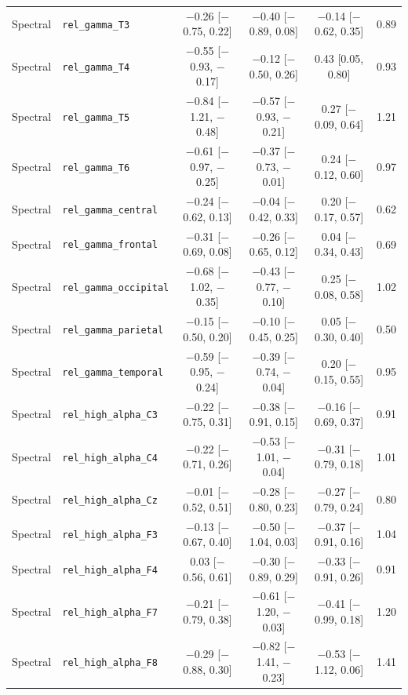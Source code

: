 {\begin{longtable}{llcccc}
Spectral & \texttt{rel\_gamma\_T3} & $-$0.26 [$-$0.75, 0.22] & $-$0.40 [$-$0.89, 0.08] & $-$0.14 [$-$0.62, 0.35] & 0.89 \\
Spectral & \texttt{rel\_gamma\_T4} & $-$0.55 [$-$0.93, $-$0.17] & $-$0.12 [$-$0.50, 0.26] & 0.43 [0.05, 0.80] & 0.93 \\
Spectral & \texttt{rel\_gamma\_T5} & $-$0.84 [$-$1.21, $-$0.48] & $-$0.57 [$-$0.93, $-$0.21] & 0.27 [$-$0.09, 0.64] & 1.21 \\
Spectral & \texttt{rel\_gamma\_T6} & $-$0.61 [$-$0.97, $-$0.25] & $-$0.37 [$-$0.73, $-$0.01] & 0.24 [$-$0.12, 0.60] & 0.97 \\
Spectral & \texttt{rel\_gamma\_central} & $-$0.24 [$-$0.62, 0.13] & $-$0.04 [$-$0.42, 0.33] & 0.20 [$-$0.17, 0.57] & 0.62 \\
Spectral & \texttt{rel\_gamma\_frontal} & $-$0.31 [$-$0.69, 0.08] & $-$0.26 [$-$0.65, 0.12] & 0.04 [$-$0.34, 0.43] & 0.69 \\
Spectral & \texttt{rel\_gamma\_occipital} & $-$0.68 [$-$1.02, $-$0.35] & $-$0.43 [$-$0.77, $-$0.10] & 0.25 [$-$0.08, 0.58] & 1.02 \\
Spectral & \texttt{rel\_gamma\_parietal} & $-$0.15 [$-$0.50, 0.20] & $-$0.10 [$-$0.45, 0.25] & 0.05 [$-$0.30, 0.40] & 0.50 \\
Spectral & \texttt{rel\_gamma\_temporal} & $-$0.59 [$-$0.95, $-$0.24] & $-$0.39 [$-$0.74, $-$0.04] & 0.20 [$-$0.15, 0.55] & 0.95 \\
Spectral & \texttt{rel\_high\_alpha\_C3} & $-$0.22 [$-$0.75, 0.31] & $-$0.38 [$-$0.91, 0.15] & $-$0.16 [$-$0.69, 0.37] & 0.91 \\
Spectral & \texttt{rel\_high\_alpha\_C4} & $-$0.22 [$-$0.71, 0.26] & $-$0.53 [$-$1.01, $-$0.04] & $-$0.31 [$-$0.79, 0.18] & 1.01 \\
Spectral & \texttt{rel\_high\_alpha\_Cz} & $-$0.01 [$-$0.52, 0.51] & $-$0.28 [$-$0.80, 0.23] & $-$0.27 [$-$0.79, 0.24] & 0.80 \\
Spectral & \texttt{rel\_high\_alpha\_F3} & $-$0.13 [$-$0.67, 0.40] & $-$0.50 [$-$1.04, 0.03] & $-$0.37 [$-$0.91, 0.16] & 1.04 \\
Spectral & \texttt{rel\_high\_alpha\_F4} & 0.03 [$-$0.56, 0.61] & $-$0.30 [$-$0.89, 0.29] & $-$0.33 [$-$0.91, 0.26] & 0.91 \\
Spectral & \texttt{rel\_high\_alpha\_F7} & $-$0.21 [$-$0.79, 0.38] & $-$0.61 [$-$1.20, $-$0.03] & $-$0.41 [$-$0.99, 0.18] & 1.20 \\
Spectral & \texttt{rel\_high\_alpha\_F8} & $-$0.29 [$-$0.88, 0.30] & $-$0.82 [$-$1.41, $-$0.23] & $-$0.53 [$-$1.12, 0.06] & 1.41 \\

\end{longtable}}
